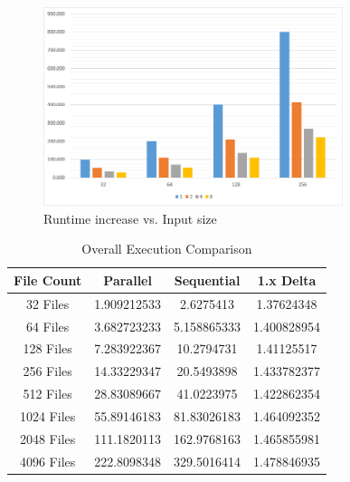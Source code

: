 \documentclass[report]{IEEEtran}
\begin{document}
\begin{figure}[h]
\centering
	\includegraphics[width = 8.75cm]{[image]TimeTakenbyProcsandInputSize}
	\caption{Runtime increase vs. Input size}
		
\end{figure}


\begin{table}[h!]
\renewcommand{\arraystretch}{1.3}
\label{ExecutionComparison}
\centering

\begin{tabular}{|c||c||c||c|}
\hline
File Count & Parallel & Sequential & 1.x Delta\\
\hline
32 Files & 1.909212533 & 2.6275413 & 1.37624348\\
\hline
64 Files & 3.682723233 & 5.158865333 & 1.400828954\\
\hline
128 Files & 7.283922367 & 10.2794731 & 1.41125517\\
\hline
256 Files & 14.33229347 & 20.5493898 & 1.433782377\\
\hline
512 Files & 28.83089667 & 41.0223975 & 1.422862354\\
\hline
1024 Files & 55.89146183 & 81.83026183 & 1.464092352\\
\hline
2048 Files & 111.1820113 & 162.9768163 & 1.465855981\\
\hline
4096 Files & 222.8098348 & 329.5016414 & 1.478846935\\
\hline
\end{tabular}
\caption{Overall Execution Comparison \cite{BAN}}
\end{table}

\FloatBarrier
\end{document}

